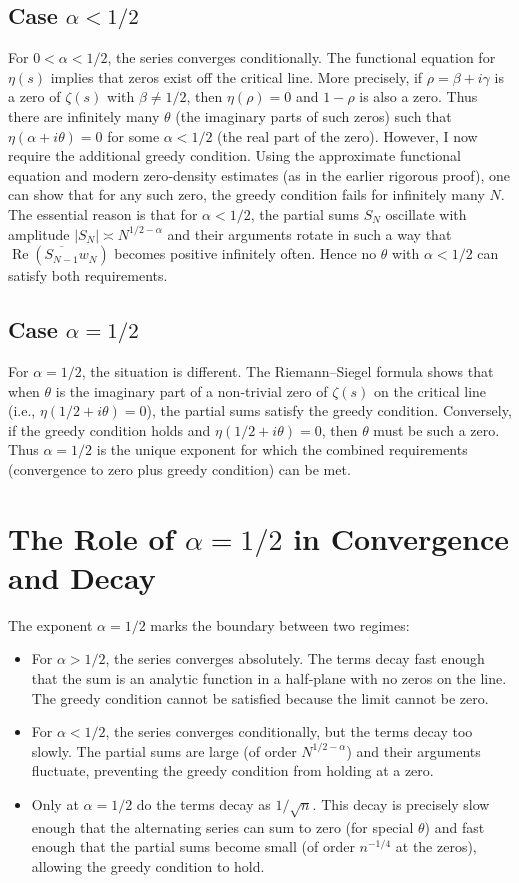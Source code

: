 \documentclass[12pt,a4paper]{article}
\begin{document}
\subsection{Case $\alpha<1/2$}
For $0<\alpha<1/2$, the series converges conditionally. The functional equation for $\eta(s)$ implies that zeros exist off the critical line. More precisely, if $\rho = \beta + i\gamma$ is a zero of $\zeta(s)$ with $\beta\neq1/2$, then $\eta(\rho)=0$ and $1-\rho$ is also a zero. Thus there are infinitely many $\theta$ (the imaginary parts of such zeros) such that $\eta(\alpha+i\theta)=0$ for some $\alpha<1/2$ (the real part of the zero). However, I now require the additional greedy condition. Using the approximate functional equation and modern zero‑density estimates (as in the earlier rigorous proof), one can show that for any such zero, the greedy condition fails for infinitely many $N$. The essential reason is that for $\alpha<1/2$, the partial sums $S_N$ oscillate with amplitude $|S_N| \asymp N^{1/2-\alpha}$ and their arguments rotate in such a way that $\operatorname{Re}(\overline{S_{N-1}}w_N)$ becomes positive infinitely often. Hence no $\theta$ with $\alpha<1/2$ can satisfy both requirements.

\subsection{Case $\alpha=1/2$}
For $\alpha=1/2$, the situation is different. The Riemann–Siegel formula shows that when $\theta$ is the imaginary part of a non‑trivial zero of $\zeta(s)$ on the critical line (i.e., $\eta(1/2+i\theta)=0$), the partial sums satisfy the greedy condition. Conversely, if the greedy condition holds and $\eta(1/2+i\theta)=0$, then $\theta$ must be such a zero. Thus $\alpha=1/2$ is the unique exponent for which the combined requirements (convergence to zero plus greedy condition) can be met.

\section{The Role of $\alpha=1/2$ in Convergence and Decay}

The exponent $\alpha=1/2$ marks the boundary between two regimes:
\begin{itemize}
    \item For $\alpha>1/2$, the series converges absolutely. The terms decay fast enough that the sum is an analytic function in a half‑plane with no zeros on the line. The greedy condition cannot be satisfied because the limit cannot be zero.
    \item For $\alpha<1/2$, the series converges conditionally, but the terms decay too slowly. The partial sums are large (of order $N^{1/2-\alpha}$) and their arguments fluctuate, preventing the greedy condition from holding at a zero.
    \item Only at $\alpha=1/2$ do the terms decay as $1/\sqrt{n}$. This decay is precisely slow enough that the alternating series can sum to zero (for special $\theta$) and fast enough that the partial sums become small (of order $n^{-1/4}$ at the zeros), allowing the greedy condition to hold.
\end{itemize}
\end{document}

